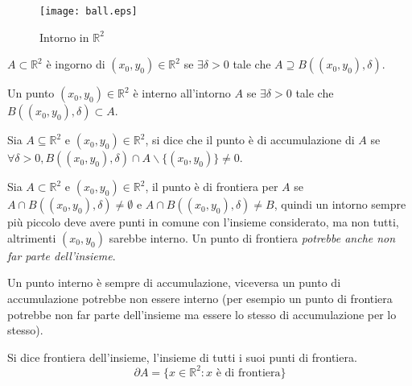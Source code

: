 \begin{figure}[h]
		\texttt{[image: ball.eps]}
		\centering
		\caption{Intorno in $\mathbb{R}^2$}
		\label{ball}
\end{figure}

\begin{definition}[Intorno]
	$A\subset \mathbb{R}^2$ è ingorno di $(x_0, y_0)\in \mathbb{R}^2$ se $\exists \delta>0$ tale che $A\supseteq B((x_0, y_0), \delta)$.
\end{definition}

\begin{definition}
	Un punto $(x_0, y_0)\in \mathbb{R}^2$ è interno all'intorno $A$ se $\exists \delta>0$ tale che $B((x_0, y_0), \delta)\subset A$.
\end{definition}

\begin{definition}
	Sia $A\subseteq\mathbb{R}^2$ e $(x_0, y_0)\in \mathbb{R}^2$, si dice che il punto è di accumulazione di $A$ se $\forall \delta>0, B((x_0, y_0), \delta)\cap A \backslash \{(x_0, y_0)\}\neq 0$.
\end{definition}

\begin{definition}
	Sia $A\subset\mathbb{R}^2$ e $(x_0, y_0)\in \mathbb{R}^2$, il punto è di frontiera per $A$ se $A\cap B((x_0, y_0), \delta) \neq \emptyset$ e $A\cap B((x_0, y_0), \delta)\neq B$, quindi un intorno sempre più piccolo deve avere punti in comune con l'insieme considerato, ma non tutti, altrimenti $(x_0, y_0)$ sarebbe interno. Un punto di frontiera \emph{potrebbe anche non far parte dell'insieme}.
\end{definition}

\begin{observation}
Un punto interno è sempre di accumulazione, viceversa un punto di accumulazione potrebbe non essere interno (per esempio un punto di frontiera potrebbe non far parte dell'insieme ma essere lo stesso di accumulazione per lo stesso).	
\end{observation}

\begin{definition}[Frontiera]
	Si dice frontiera dell'insieme, l'insieme di tutti i suoi punti di frontiera.
	\begin{equation}
		\partial A=\{x\in \mathbb{R}^2 : x \text{ è di frontiera}\}
	\end{equation}
\end{definition}

